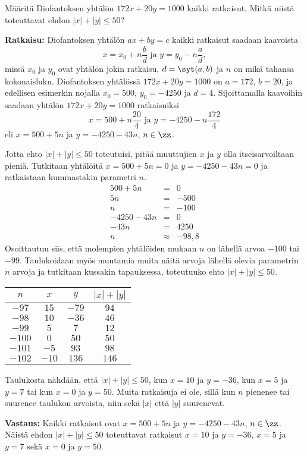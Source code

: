 \begin{esimerkki}
Määritä Diofantoksen yhtälön $172x + 20y = 1000$ kaikki
ratkaisut. Mitkä niistä toteuttavat ehdon $|x|+|y|\le
50$?

{\bf Ratkaisu:}
Diofantoksen yhtälön $ax+by=c$ kaikki ratkaisut saadaan
kaavoista
\[
x=x_0+n\frac{b}{d}\textrm{ ja }y=y_0-n\frac{a}{d},
\]
missä $x_0$ ja $y_0$ ovat yhtälön jokin ratkaisu,
$d=\syt(a, b)$ ja $n$ on mikä tahansa
kokonaisluku. Diofantoksen yhtälössä $172x+20y=1000$ on
$a=172$, $b=20$, ja edellisen
esimerkin nojalla $x_0=500$, $y_0=-4250$ ja $d=4$.
Sijoittamalla kaavoihin saadaan
yhtälön $172x+20y=1000$ ratkaisuiksi
\[
x=500+n\frac{20}{4}\textrm{ ja }y=-4250-n\frac{172}{4}
\]
eli $x=500+5n$ ja $y=-4250-43n$, $n\in\zz$.

Jotta ehto $|x| +|y|\le 50$ toteutuisi, pitää muuttujien
$x$ ja $y$ olla itseisarvoiltaan pieniä. Tutkitaan
yhtälöitä $x = 500 + 5n = 0$ ja $y = -4250 - 43n = 0$ ja
ratkaistaan kummastakin parametri $n$.
\begin{eqnarray*}
500 + 5n &=& 0\\
5n &=& -500\\
n &=& -100\\
-4250 - 43n &=& 0\\
-43n &=& 4250\\
n &\approx&-98,8
\end{eqnarray*}
Osoittautuu siis, että molempien yhtälöiden mukaan $n$
on lähellä arvoa $-100$ tai $-99$. Taulukoidaan myös
muutamia muita näitä arvoja lähellä olevia parametrin $n$
arvoja ja tutkitaan kussakin tapauksessa, toteutuuko ehto
$|x| + |y| \le 50$.

\begin{center}
\begin{tabular}{|c|c|c|c|}
\hline
$n$ & $x$ & $y$ & $|x|+|y|$ \\

\hline
$-97$&$15$&$-79$&$94$\\
\hline
$-98$&$10$&$-36$&$46$\\
\hline
$-99$&$5$&$7$&$12$\\
\hline
$-100$&$0$&$50$&$50$\\
\hline
$-101$&$-5$&$93$&$98$\\
\hline
$-102$&$-10$&$136$&$146$\\
\hline
\end{tabular}
\end{center}

Taulukosta nähdään, että $|x|+|y| \le 50$, kun $x = 10$
ja $y = -36$, kun $x = 5$ ja $y = 7$ tai kun $x = 0$ ja
$y = 50$. Muita ratkaisuja ei ole, sillä kun $n$ pienenee
tai suurenee taulukon arvoista, niin sekä $|x|$ että $|
y|$ suurenevat.

{\bf Vastaus:} Kaikki ratkaisut ovat  $x=500+5n$ ja $y=-4250-43n$, $n\in\zz$. Näistä ehdon $|x|+|y|\le 50$ toteuttavat ratkaisut $x = 10$ ja $y = -36$, $x = 5$ ja $y = 7$ sekä $x = 0$ ja $y = 50$.
\end{esimerkki}

